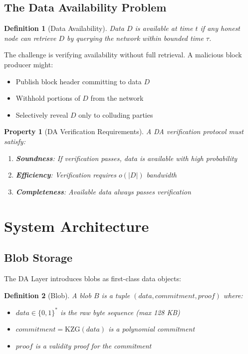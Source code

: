 \documentclass[11pt,a4paper]{article}
\newtheorem{definition}{Definition}
\newtheorem{property}{Property}
\begin{document}
\subsection{The Data Availability Problem}

\begin{definition}[Data Availability]
Data $D$ is available at time $t$ if any honest node can retrieve $D$ by querying the network within bounded time $\tau$.
\end{definition}

The challenge is verifying availability without full retrieval. A malicious block producer might:
\begin{itemize}
    \item Publish block header committing to data $D$
    \item Withhold portions of $D$ from the network
    \item Selectively reveal $D$ only to colluding parties
\end{itemize}

\begin{property}[DA Verification Requirements]
A DA verification protocol must satisfy:
\begin{enumerate}
    \item \textbf{Soundness}: If verification passes, data is available with high probability
    \item \textbf{Efficiency}: Verification requires $o(|D|)$ bandwidth
    \item \textbf{Completeness}: Available data always passes verification
\end{enumerate}
\end{property}

\section{System Architecture}

\subsection{Blob Storage}

The DA Layer introduces blobs as first-class data objects:

\begin{definition}[Blob]
A blob $B$ is a tuple $(data, commitment, proof)$ where:
\begin{itemize}
    \item $data \in \{0,1\}^*$ is the raw byte sequence (max 128 KB)
    \item $commitment = \text{KZG}(data)$ is a polynomial commitment
    \item $proof$ is a validity proof for the commitment
\end{itemize}
\end{definition}
\end{document}
